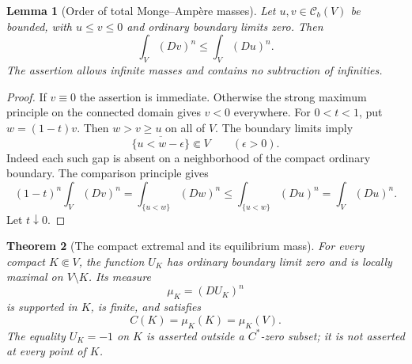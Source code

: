 \documentclass[11pt,a4paper]{article}
\numberwithin{equation}{section}
\newtheorem{theorem}{Theorem}[section]
\newtheorem{lemma}[theorem]{Lemma}
\theoremstyle{definition}
\theoremstyle{remark}
\newcommand{\Cb}{\mathcal C_b}
\begin{document}
\begin{lemma}[Order of total Monge--Amp\`ere masses]
\label{lem:r2-total-mass-order}
Let $u,v\in\Cb(V)$ be bounded, with
$u\leq v\leq0$ and ordinary boundary limits zero. Then
\[
 \int_V(Dv)^n\leq\int_V(Du)^n.
\]
The assertion allows infinite masses and contains no
subtraction of infinities.
\end{lemma}

\begin{proof}
If $v\equiv0$ the assertion is immediate. Otherwise the
strong maximum principle on the connected domain gives
$v<0$ everywhere. For $0<t<1$, put $w=(1-t)v$.
Then $w>v\geq u$ on all of $V$. The boundary limits imply
\[
 \overline{\{u<w-\epsilon\}}\Subset V\qquad(\epsilon>0).
\]
Indeed each such gap is absent on a neighborhood of the
compact ordinary boundary. The comparison principle gives
\[
 (1-t)^n\int_V(Dv)^n
  =\int_{\{u<w\}}(Dw)^n
  \leq\int_{\{u<w\}}(Du)^n
  =\int_V(Du)^n.
\]
Let $t\downarrow0$.
\end{proof}

\begin{theorem}[The compact extremal and its equilibrium mass]
\label{thm:r2-compact-extremal}
For every compact $K\Subset V$, the function $U_K$ has
ordinary boundary limit zero and is locally maximal on
$V\setminus K$. Its measure
\[
 \mu_K=(DU_K)^n
\]
is supported in $K$, is finite, and satisfies
\begin{equation}
\label{eq:r2-compact-capacity-mass}
 C(K)=\mu_K(K)=\mu_K(V).
\end{equation}
The equality $U_K=-1$ on $K$ is asserted outside a
$C^*$-zero subset; it is not asserted at every point of $K$.
\end{theorem}
\end{document}
